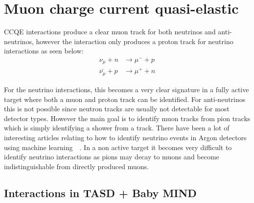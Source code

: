 \section{Muon charge current quasi-elastic}

CCQE interactions produce a clear muon track for both neutrinos and anti-neutrinos, however the interaction only produces a proton track for neutrino interactions as seen below:
\begin{align}
\nu_\mu + n &\rightarrow \mu^- + p\\
 \bar{\nu_\mu} + p &\rightarrow \mu^+ + n
\end{align}

For the neutrino interactions, this becomes a very clear signature in a fully active target where both a muon and proton track can be identified. For anti-neutrinos this is not possible since neutron tracks are usually not detectable for most detector types. However the main goal is to identify muon tracks from pion tracks which is simply identifying a shower from a track. There have been a lot of interesting articles relating to how to identify neutrino events in Argon detectors using machine learning~\cite{83Radovic2018}~\cite{84Adams}. In a non active target it becomes very difficult to identify neutrino interactions as pions may decay to muons and become indistinguishable from directly produced muons.





\pagebreak
\subsection{Interactions in TASD + Baby MIND}

